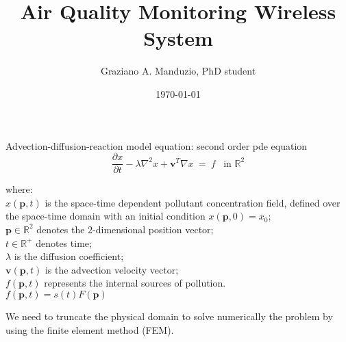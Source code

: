 \documentclass{beamer}
\title{Air Quality Monitoring Wireless System}
\author{Graziano A. Manduzio, PhD student}
\institute{University of Florence}
\date{\today}
\newcommand{\mb}{\mathbf}
\begin{document}
\begin{frame}
	\titlepage
\end{frame}

\begin{frame}
Advection-diffusion-reaction model equation: second order pde equation
\begin{equation}
		\displaystyle{\frac{\partial x}{\partial t}} - \lambda \nabla^2 x + \mb{v}^T \nabla x  ~=~ f \,\,\,\,\, \mbox{in } \mathbb{R}^2
\end{equation}

where:\\
	$x(\mb{p},t)$ is the space-time dependent pollutant concentration field, defined over the space-time domain with an initial condition $x(\mb{p},0)=x_{0}$;\\
	$\mb{p} \in \mathbb{R}^2$ denotes the $2$-dimensional position vector;\\
	$t \in \mathbb{R}^{+}$ denotes time;\\
	$\lambda$ is the diffusion coefficient;\\
	$\mb{v}(\mb{p},t)$ is the advection velocity vector;\\
	$f(\mb{p},t)$ represents the internal sources of pollution.\\
	$f(\mb{p},t)=s(t)F(\mb{p})$
\end{frame}
\begin{frame}
We need to truncate the physical domain to solve numerically the problem by using the finite element method (FEM).
\end{frame}
\end{document}
